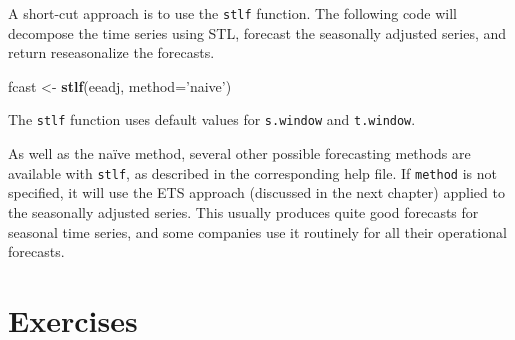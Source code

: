 \documentclass[]{book}
\newenvironment{Shaded}{\begin{snugshade}}{\end{snugshade}}
\newcommand{\DataTypeTok}[1]{\textcolor[rgb]{0.13,0.29,0.53}{#1}}
\newcommand{\KeywordTok}[1]{\textcolor[rgb]{0.13,0.29,0.53}{\textbf{#1}}}
\newcommand{\NormalTok}[1]{#1}
\newcommand{\StringTok}[1]{\textcolor[rgb]{0.31,0.60,0.02}{#1}}
\begin{document}
A short-cut approach is to use the \texttt{stlf} function. The following code will decompose the time series using STL, forecast the seasonally adjusted series, and return reseasonalize the forecasts.

\begin{Shaded}
\begin{Highlighting}[]
\NormalTok{fcast <-}\StringTok{ }\KeywordTok{stlf}\NormalTok{(eeadj, }\DataTypeTok{method=}\StringTok{'naive'}\NormalTok{)}
\end{Highlighting}
\end{Shaded}

The \texttt{stlf} function uses default values for \texttt{s.window} and \texttt{t.window}.

As well as the naïve method, several other possible forecasting methods are available with \texttt{stlf}, as described in the corresponding help file. If \texttt{method} is not specified, it will use the ETS approach (discussed in the next chapter) applied to the seasonally adjusted series. This usually produces quite good forecasts for seasonal time series, and some companies use it routinely for all their operational forecasts.

\hypertarget{exercises-1}{%
\section{Exercises}\label{exercises-1}}
\end{document}
